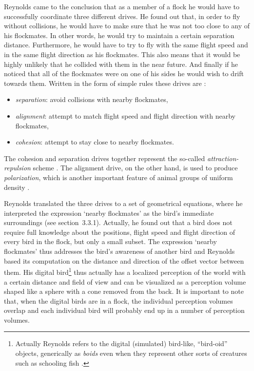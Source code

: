 Reynolds \cite{reynolds:1987} came to the conclusion that as a member of a flock he would have to successfully coordinate three different drives. He found out that, in order to fly without collisions, he would have to make sure that he was not too close to any of his flockmates. In other words, he would try to maintain a certain separation distance. Furthermore, he would have to try to fly with the same flight speed and in the same flight direction as his flockmates. This also means that it would be highly unlikely that he collided with them in the near future. And finally if he noticed that all of the flockmates were on one of his sides he would wish to drift towards them. Written in the form of simple rules these drives are \cite{reynolds:1987,reynolds:1999,reynolds:2000}:

\begin{itemize}
\item {\emph{separation}}: avoid collisions with nearby flockmates,
\item {\emph{alignment}}: attempt to match flight speed and flight direction with nearby flockmates,
\item {\emph{cohesion}}: attempt to stay close to nearby flockmates.
\end{itemize}

The cohesion and separation drives together represent the so-called \emph{attraction-repul\-sion} scheme \cite{okubo:1980}. The alignment drive, on the other hand, is used to produce \emph{polarization}, which is another important feature of animal groups of uniform density \cite{parrish:1997a}. 

Reynolds translated the three drives to a set of geometrical equations, where he interpreted the expression `nearby flockmates' as the bird's immediate surroundings (see section~3.3.1). Actually, he found out that a bird does not require full knowledge about the positions, flight speed and flight direction of every bird in the flock, but only a small subset. The expression `nearby flockmates' thus addresses the bird's awareness of another bird and Reynolds based its computation on the distance and direction of the offset vector between them. His digital bird\footnote{Actually Reynolds refers to the digital (simulated) bird-like, ``bird-oid'' objects, generically as \emph{boids} even when they represent other sorts of creatures such as schooling fish \cite{reynolds:1987}.} thus actually has a localized perception of the world with a certain distance and field of view and can be visualized as a perception volume shaped like a sphere with a cone removed from the back. It is important to note that, when the digital birds are in a flock, the individual perception volumes overlap and each individual bird will probably end up in a number of perception volumes.

